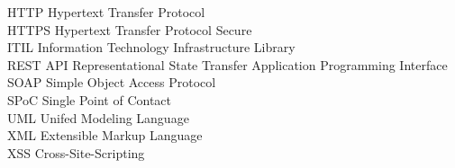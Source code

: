 \documentclass[fontsize=12pt]{scrartcl}
\begin{document}
\noindent
HTTP \tabto{4cm} Hypertext Transfer Protocol\\

\noindent
HTTPS \tabto{4cm} Hypertext Transfer Protocol Secure\\

\noindent
ITIL \tabto{4cm} Information Technology Infrastructure Library\\

\noindent
REST API \tabto{4cm} Representational State Transfer Application Programming Interface\\

\noindent
SOAP \tabto{4cm} Simple Object Access Protocol\\

\noindent
SPoC \tabto{4cm} Single Point of Contact\\

\noindent
UML \tabto{4cm} Unifed Modeling Language\\

\noindent
XML \tabto{4cm} Extensible Markup Language\\

\noindent
XSS \tabto{4cm} Cross-Site-Scripting
\newpage

\vspace*{-1cm}
\begin{spacing}{1.8}
\listoftables
\end{spacing}
\newpage



\setcounter{page}{1}


\newpage 


	
\newpage
\end{document}
